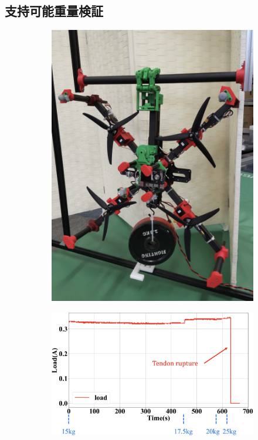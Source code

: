 \documentclass{jarticle}
\begin{document}
\subsection{支持可能重量検証}
\vspace{-4mm}
\begin{figure}[H]
  \centering
  \begin{subfigure}{0.28\columnwidth}
    \includegraphics[width=\textwidth]{figs/bear1.eps}
    \vspace{-6mm}
    \caption{}
    \label{fig:bear1}
  \end{subfigure}
  \begin{subfigure}{0.6\columnwidth}
    \includegraphics[width=\textwidth]{figs/bear2.eps}

\end{subfigure}
\end{figure}
\end{document}
